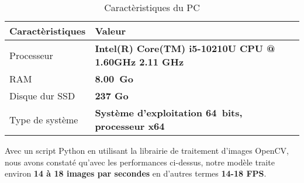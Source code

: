     \begin{table}[H]
        \centering
        \begin{tabular}{|l|l|}
            \hline
            \rowcolor{Gray}
            \textbf{Caractèristiques} & \textbf{Valeur} \\ \hline
            Processeur & \textbf{Intel(R) Core(TM) i5-10210U CPU @ 1.60GHz   2.11 GHz} \\ \hline
            RAM & \textbf{8.00 Go} \\ \hline
            Disque dur SSD & \textbf{237 Go} \\ \hline
            Type de système & \textbf{Système d’exploitation 64 bits, processeur x64} \\ \hline
        \end{tabular}
        \caption{Caractèristiques du PC}
    \end{table}
    Avec un script Python en utilisant la librairie de traitement d’images OpenCV, nous avons constaté qu’avec les performances ci-dessus, notre modèle traite environ \textbf{14 à 18 images par secondes} en d’autres termes \textbf{14-18 FPS}.
    